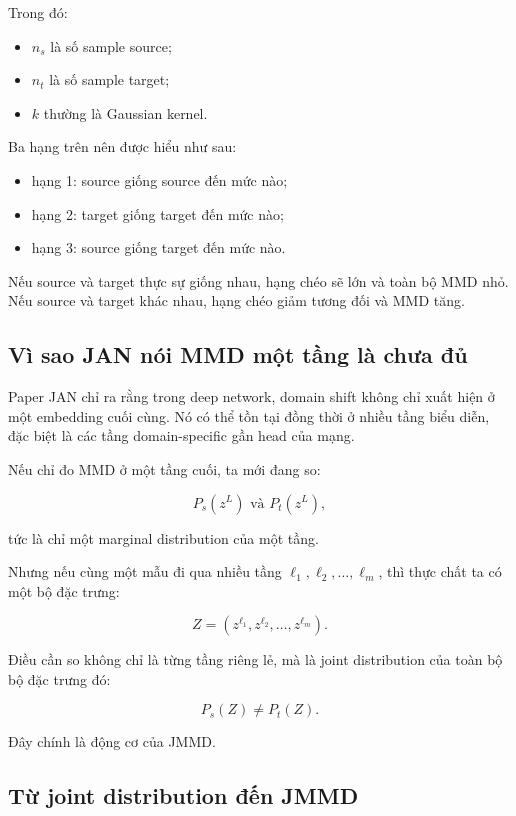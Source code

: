 \documentclass[a4paper]{article}
\begin{document}
Trong đó:

\begin{itemize}
    \item $n_s$ là số sample source;
    \item $n_t$ là số sample target;
    \item $k$ thường là Gaussian kernel.
\end{itemize}

Ba hạng trên nên được hiểu như sau:

\begin{itemize}
    \item hạng 1: source giống source đến mức nào;
    \item hạng 2: target giống target đến mức nào;
    \item hạng 3: source giống target đến mức nào.
\end{itemize}

Nếu source và target thực sự giống nhau, hạng chéo sẽ lớn và toàn bộ MMD nhỏ. Nếu source và target khác nhau, hạng chéo giảm tương đối và MMD tăng.

\subsection{Vì sao JAN nói MMD một tầng là chưa đủ}

Paper JAN chỉ ra rằng trong deep network, domain shift không chỉ xuất hiện ở một embedding cuối cùng. Nó có thể tồn tại đồng thời ở nhiều tầng biểu diễn, đặc biệt là các tầng domain-specific gần head của mạng.

Nếu chỉ đo MMD ở một tầng cuối, ta mới đang so:

\[
P_s(z^{L}) \text{ và } P_t(z^{L}),
\]

tức là chỉ một marginal distribution của một tầng.

Nhưng nếu cùng một mẫu đi qua nhiều tầng $\ell_1, \ell_2, \dots, \ell_m$, thì thực chất ta có một bộ đặc trưng:

\[
Z = (z^{\ell_1}, z^{\ell_2}, \dots, z^{\ell_m}).
\]

Điều cần so không chỉ là từng tầng riêng lẻ, mà là joint distribution của toàn bộ bộ đặc trưng đó:

\[
P_s(Z) \neq P_t(Z).
\]

Đây chính là động cơ của JMMD.

\subsection{Từ joint distribution đến JMMD}
\end{document}
